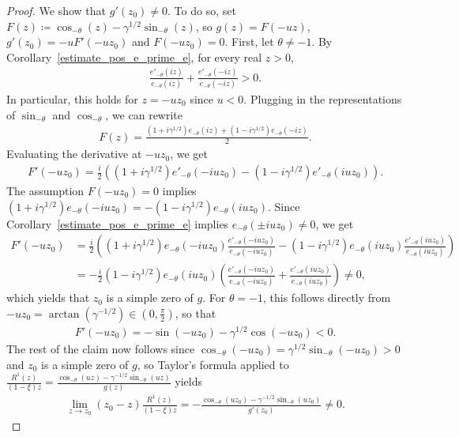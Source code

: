 \documentclass[10pt,a4paper]{amsart}
\newcommand{\1}{\mathds{1}}
\begin{document}
\begin{proof}
We show that $g'(z_0)\ne 0$. To do so, set $F(z)\coloneqq \cos_{-\theta}(z)-\gamma^{1/2}\sin_{-\theta}(z)$, so $g(z)=F(-uz)$, $g'(z_0)=-uF'(-uz_0)$ and $F(-uz_0)=0$. First, let $\theta\neq -1$. By Corollary~\ref{estimate_pos_e_prime_e}, for every real $z>0$, 
\begin{align*}
    \frac{e'_{-\theta} (iz)}{e_{-\theta} (iz)}+\frac{e'_{-\theta}(-iz)}{e_{-\theta}(-iz)}>0.
\end{align*}
In particular, this holds for $z=-uz_0$ since $u<0$.
Plugging in the representations of $\sin_{-\theta}$ and $\cos_{-\theta}$, we can rewrite
\begin{align*}
    F(z)=\frac{(1+i\gamma^{1/2})e_{-\theta} (iz)+(1-i\gamma^{1/2})e_{-\theta}(-iz)}{2}.
\end{align*}
Evaluating the derivative at $-uz_0$, we get
\begin{align*}
    F'(-uz_0)=\frac{i}{2}\left((1+i\gamma^{1/2})e'_{-\theta} (-iuz_0)-(1-i\gamma^{1/2})e'_{-\theta}(iuz_0)\right).
\end{align*}
The assumption $F(-uz_0)=0$ implies $(1+i\gamma^{1/2})e_{-\theta}(-iuz_0)=-(1-i\gamma^{1/2})e_{-\theta}(iuz_0)$. Since Corollary~\ref{estimate_pos_e_prime_e} implies $e_{-\theta}(\pm iuz_0)\neq0$, we get
\begin{align*}
    F'(-uz_0)
    &=\frac{i}{2}\left((1+i\gamma^{1/2})e_{-\theta}(-iuz_0)\frac{e'_{-\theta}(-iuz_0)}{e_{-\theta}(-iuz_0)}-(1-i\gamma^{1/2})e_{-\theta}(iuz_0)\frac{e'_{-\theta}(iuz_0)}{e_{-\theta}(iuz_0)}\right)
    \\&=-\frac{i}{2}(1-i\gamma^{1/2})e_{-\theta} (iuz_0)\left(\frac{e'_{-\theta}(-iuz_0)}{e_{-\theta}(-iuz_0)}+\frac{e'_{-\theta} (iuz_0)}{e_{-\theta} (iuz_0)}\right)\ne 0,
\end{align*}
which yields that $z_0$ is a simple zero of $g$. For $\theta=-1$, this follows directly from $-uz_0=\arctan(\gamma^{-1/2})\in\left(0,\frac{\pi}{2}\right)$, so that
\begin{align*}
    F'(-uz_0)=-\sin(-uz_0)-\gamma^{1/2}\cos(-uz_0)<0.
\end{align*}
The rest of the claim now follows since $\cos_{-\theta}(-uz_0)=\gamma^{1/2}\sin_{-\theta}(-uz_0)> 0$ and $z_0$ is a simple zero of $g$, so Taylor's formula applied to $\frac{R^1(z)}{(1-\xi) z}=\frac{\cos_{-\theta}(uz)-\gamma^{-1/2}\sin_{-\theta}(uz)}{g(z)}$ yields
\begin{align*}
      \lim_{z\to z_0}\left(z_0-z\right)\frac{R^1(z)}{(1-\xi) z}=-\frac{\cos_{-\theta}(uz_0)-\gamma^{-1/2}\sin_{-\theta}(uz_0)}{g'(z_0)}\neq 0. \tag*{\qedhere}
\end{align*}
\end{proof}
\end{document}
